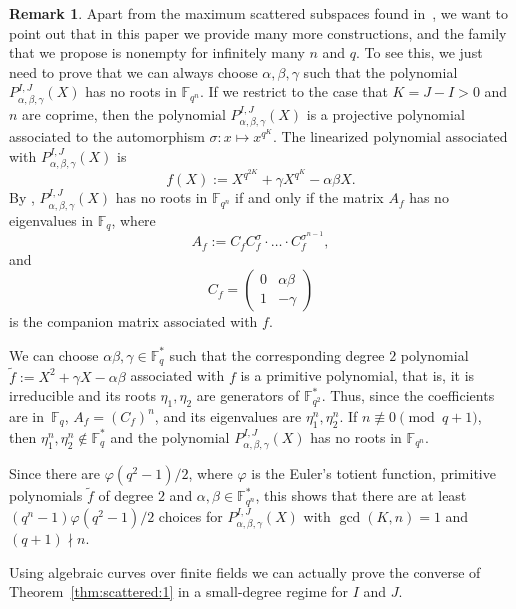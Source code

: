 \documentclass[11pt]{article}
\theoremstyle{definition}
\newtheorem{rema}[theo]{Remark}
\numberwithin{equation}{section}
\begin{document}
\begin{rema}\label{rem:no_roots}
Apart from the maximum scattered subspaces found in~\cite{BMN2022}, we want to point out that in this paper we provide many more constructions, and the family that we propose is nonempty for infinitely many $n$ and $q$. To see this, we just need to prove that we can always choose $\alpha, \beta,\gamma$ such that the polynomial $P^{I,J}_{\alpha,\beta,\gamma}(X)$ has no roots in ${\mathbb F}_{q^n}$. If we restrict to the case that $K=J-I>0$ and $n$ are coprime, then the polynomial $P^{I,J}_{\alpha,\beta,\gamma}(X)$ is a projective polynomial associated to the automorphism $\sigma\colon x\longmapsto x^{q^K}$. The  linearized polynomial associated with $P^{I,J}_{\alpha,\beta,\gamma}(X)$ is $$f(X):=X^{q^{2K}} + \gamma X^{q^K} - \alpha\beta X.$$
By \cite[Theorem 6]{mcguire2019characterization}, $P^{I,J}_{\alpha,\beta,\gamma}(X)$ has no roots in ${\mathbb F}_{q^n}$ if and only if the matrix $A_f$ has no eigenvalues in $\mathbb{F}_q$, where
$$A_f:=C_f C_f^\sigma\cdot\ldots\cdot C_f^{\sigma^{n-1}},$$
and 
$$C_f=\begin{pmatrix}
0 & \alpha\beta  \\
1& -\gamma
\end{pmatrix}$$
is the companion matrix associated with $f$. 

We can choose $\alpha\beta,\gamma \in \mathbb{F}_q^*$ such that the corresponding degree $2$ polynomial \mbox{$\tilde{f}:=X^2+\gamma X-\alpha\beta$} associated with $f$ is a primitive polynomial, that is, it is irreducible and its roots $\eta_1,\eta_2$ are generators of $\mathbb{F}_{q^2}^*$. Thus, since the coefficients are in~$\mathbb{F}_q$,  $A_f=(C_f)^n$, and its eigenvalues are $\eta_1^n,\eta_2^n$. If $n \not\equiv 0 \pmod{q+1}$, then $\eta_1^n,\eta_2^n\notin \mathbb{F}_q^*$ and the polynomial $P^{I,J}_{\alpha,\beta,\gamma}(X)$ has no roots in ${\mathbb F}_{q^n}$. 

Since there are $\varphi(q^2-1)/2$, where $\varphi$ is the Euler's totient function, primitive polynomials $\tilde{f}$ of degree $2$ and $\alpha,\beta\in \mathbb{F}_{q^n}^*$, this shows that there are at least \mbox{$(q^n-1)\varphi(q^2-1)/2$} choices for $P^{I,J}_{\alpha,\beta,\gamma}(X)$ with $\gcd(K,n)=1$ and $(q+1)\nmid n$.
\end{rema}

Using algebraic curves  over finite fields we can actually prove the converse of Theorem~\ref{thm:scattered:1} in a small-degree regime for $I$ and $J$. 
\end{document}
